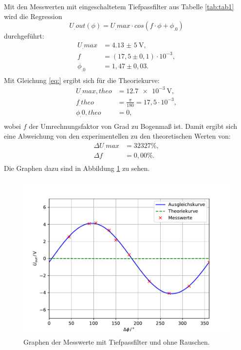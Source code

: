 \noindent Mit den Messwerten mit eingeschaltetem Tiefpassfilter aus Tabelle \ref{tab:tab1} wird die Regression
\begin{equation}
U_.{out}(\phi) = U_.{max}\cdot cos(f\cdot\phi+\phi_.0)\label{eq:Reg}
\end{equation}
durchgeführt:
\begin{align*}
U_.{max} &= \SI{4,13(5)}{\volt}, \\
f 		 &= (17,5\pm0,1)\cdot 10^{-3}, \\
\phi_.0  &= 1,47 \pm0,03 \text{.}\\
\end{align*}
Mit Gleichung \eqref{eq:} ergibt sich für die Theoriekurve:
\begin{align*}
U_.{max,theo} &= \SI{12,7e-3}{\volt}, \\
f_.{theo}	  &= \frac{\pi}{180} = 17,5 \cdot 10^{-3}, \\
\phi_.{0,theo}&= 0, \\
\end{align*}
wobei $f$ der Umrechnungsfaktor von Grad zu Bogenmaß ist.
Damit ergibt sich eine Abweichung von den experimentellen zu den theoretischen Werten von:
\begin{align*}
\Delta U_.{max} &= 32327\% ,\\
\Delta f		&= 0,00\% \text{.}\\
\end{align*}
Die Graphen dazu sind in Abbildung \ref{fig:U2} zu sehen.

\begin{figure}
\centering
\includegraphics[width=\linewidth-75pt,height=\textheight-75pt,keepaspectratio]{content/images/plot.pdf}
\caption{Graphen der Messwerte mit Tiefpassfilter und ohne Rauschen.}
\label{fig:U2}
\end{figure}


